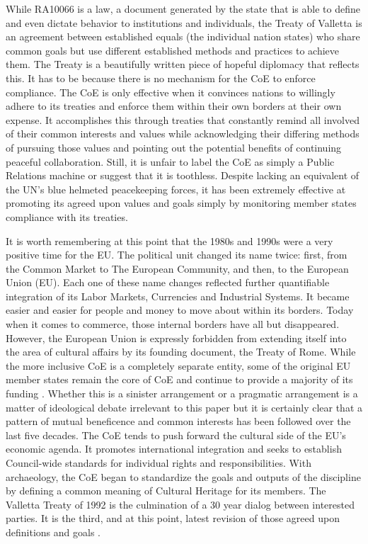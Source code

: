 While RA10066 is a law, a document generated by the state that is able to define and even dictate behavior to institutions and individuals, the Treaty of Valletta is an agreement between established equals (the individual nation states) who share common goals but use different established methods and practices to achieve them. The Treaty is a beautifully written piece of hopeful diplomacy that reflects this. It has to be because there is no mechanism for the CoE to enforce compliance. The CoE is only effective when it convinces nations to willingly adhere to its treaties and enforce them within their own borders at their own expense. It accomplishes this through treaties that constantly remind all involved of their common interests and values while acknowledging their differing methods of pursuing those values and pointing out the potential benefits of continuing peaceful collaboration. Still, it is unfair to label the CoE as simply a Public Relations machine or suggest that it is toothless. Despite lacking an equivalent of the UN’s blue helmeted peacekeeping forces, it has been extremely effective at promoting its agreed upon values and goals simply by monitoring member states compliance with its treaties.   

It is worth remembering at this point that the 1980s and 1990s were a very positive time for the EU. The political unit changed its name twice: first, from the Common Market to The European Community, and then, to the European Union (EU). Each one of these name changes reflected further quantifiable integration of its Labor Markets, Currencies and Industrial Systems. It became easier and easier for people and money to move about within its borders. Today when it comes to commerce, those internal borders have all but disappeared. However, the European Union is expressly forbidden from extending itself into the area of cultural affairs by its founding document, the Treaty of Rome. While the more inclusive CoE is a completely separate entity, some of the original EU member states remain the core of CoE and continue to provide a majority of its funding \parencite[74]{CoE_2000}. 
Whether this is a sinister arrangement or a pragmatic arrangement is a matter of ideological debate irrelevant to this paper but it is certainly clear that a pattern of mutual beneficence and common interests has been followed over the last five decades. The CoE tends to push forward the cultural side of the EU’s economic agenda. It promotes international integration and seeks to establish Council-wide standards for individual rights and responsibilities. With archaeology, the CoE began to standardize the goals and outputs of the discipline by defining a common meaning of Cultural Heritage for its members. The Valletta Treaty of 1992 is the culmination of a 30 year dialog between interested parties. It is the third, and at this point, latest revision of those agreed upon definitions and goals \parencite{Valletta_1992}. 

